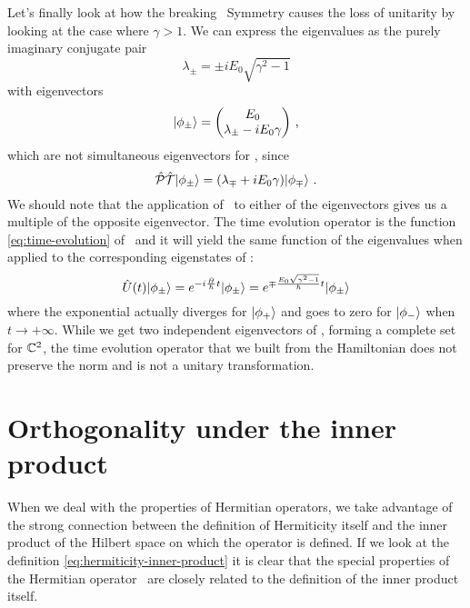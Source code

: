         Let's finally look at how the breaking \PT\ Symmetry causes the loss of unitarity by looking at the case where $\gamma > 1$. We can express the eigenvalues as the purely imaginary conjugate pair
        \begin{equation*}
            \lambda_\pm = \pm i E_0 \sqrt{\gamma^2 - 1}
        \end{equation*}
        with eigenvectors
        \begin{equation*}
            \ket{\phi_\pm} = \pmqty{E_0 \\ \lambda_\pm - i E_0 \gamma }
            \mycomma
        \end{equation*}
        which are not simultaneous eigenvectors for \hPT, since
        \begin{equation*}
            \hPT\!\ket{\phi_\pm} = \pqty{\lambda_\mp + i E_0 \gamma}\!\ket{\phi_\mp}
            \myperiod
        \end{equation*}
        We should note that the application of \hPT\ to either of the eigenvectors gives us a multiple of the opposite eigenvector. The time evolution operator is the function \eqref{eq:time-evolution} of \hH\ and it will yield the same function of the eigenvalues when applied to the corresponding eigenstates of \hH :
        \begin{equation*}
            \hU\pqty{t}\!\ket{\phi_\pm}
            = \myexp{-i\frac{\hH}{\hbar}t}\!\ket{\phi_\pm}
            = \myexp{\mp\frac{E_0\sqrt{\gamma^2-1}}{\hbar}t}\!\ket{\phi_\pm}
        \end{equation*}
        where the exponential actually diverges for $\ket{\phi_+}$ and goes to zero for $\ket{\phi_-}$ when $t\to +\infty$. While we get two independent eigenvectors of \hH, forming a complete set for $\mathbb{C}^2$, the time evolution operator that we built from the Hamiltonian does not preserve the norm and is not a unitary transformation.

        

    \section{Orthogonality under the \texorpdfstring{\PT}{PT} inner product}\label{s:orthogonality}
        When we deal with the properties of Hermitian operators, we take advantage of the strong connection between the definition of Hermiticity itself and the inner product of the Hilbert space on which the operator is defined. If we look at the definition \eqref{eq:hermiticity-inner-product} it is clear that the special properties of the Hermitian operator \hA\ are closely related to the definition of the inner product itself.
        
